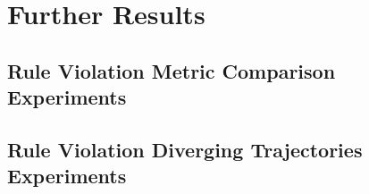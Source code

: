 \documentclass{article}
\begin{document}
\section{Further Results}

\subsection{Rule Violation Metric Comparison Experiments}

\subsection{Rule Violation Diverging Trajectories Experiments}








\end{document}
